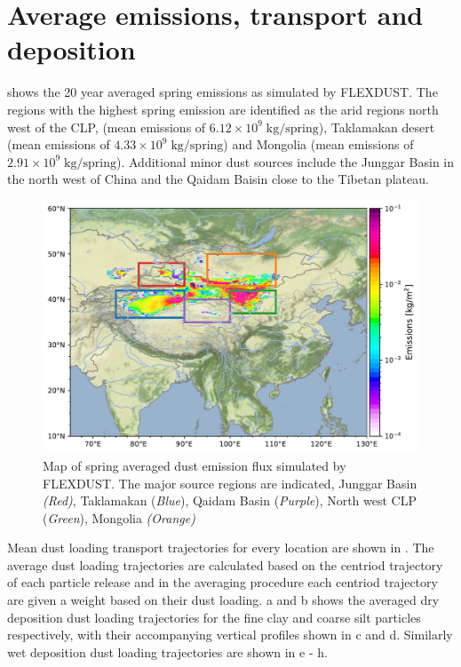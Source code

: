 \section{Average emissions, transport and deposition}
 shows the 20 year averaged spring emissions as simulated by FLEXDUST. The regions with the highest spring emission are identified as the arid regions north west of the CLP,  (mean emissions of $6.12\times 10^9\; \si{\kg}/ \mathrm{spring}$), Taklamakan desert (mean emissions of $4.33\times 10^9\; \si{\kg} / \mathrm{spring}$) and Mongolia (mean emissions of $2.91\times 10^9\; \si{\kg} / \mathrm{spring}$). Additional minor dust sources include the Junggar Basin in the north west of China and the Qaidam Baisin close to the Tibetan plateau.  
\begin{figure}[hptb]
    \centering
    \includegraphics[width=\textwidth]{../figs/emission_map_1999_2019.pdf}
    \caption{Map of spring averaged dust emission flux simulated by FLEXDUST. The major source regions are indicated,  Junggar Basin \emph{(Red)},  Taklamakan (\emph{Blue}),  Qaidam Basin (\emph{Purple}), North west CLP (\emph{Green}),  Mongolia \emph{(Orange)}}
    \label{fig:emission_map_flexdust}
\end{figure}
\par Mean dust loading transport trajectories for every location are shown in . The average dust loading trajectories are calculated based on the centriod trajectory of each particle release and in the averaging procedure each centriod trajectory are given a weight based on their dust loading.  a and b shows the averaged dry deposition dust loading trajectories for the fine clay and coarse silt particles respectively, with their accompanying vertical profiles shown in c and d. Similarly wet deposition dust loading trajectories are shown in e - h. 
